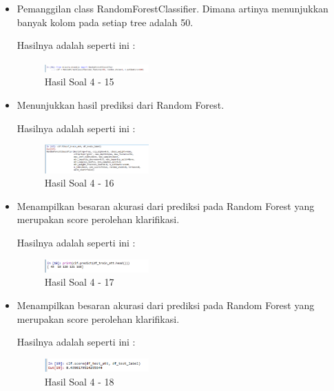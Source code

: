 \begin{enumerate}
\begin{itemize}
	\item Pemanggilan class RandomForestClassifier. Dimana artinya menunjukkan banyak kolom pada setiap tree adalah 50.
	
	Hasilnya adalah seperti ini :

	\begin{figure}[H]
	\centering
		\includegraphics[width=4cm]{figures/1174021/tugas3/materi/soal415.PNG}
		\caption{Hasil Soal 4 - 15}
	\end{figure}

	\item Menunjukkan hasil prediksi dari Random Forest.
	
	Hasilnya adalah seperti ini :

	\begin{figure}[H]
	\centering
		\includegraphics[width=4cm]{figures/1174021/tugas3/materi/soal416.PNG}
		\caption{Hasil Soal 4 - 16}
	\end{figure}

	\item Menampilkan besaran akurasi dari prediksi pada Random Forest yang merupakan score perolehan klarifikasi.
	
	Hasilnya adalah seperti ini :

	\begin{figure}[H]
	\centering
		\includegraphics[width=4cm]{figures/1174021/tugas3/materi/soal417.PNG}
		\caption{Hasil Soal 4 - 17}
	\end{figure}

	\item Menampilkan besaran akurasi dari prediksi pada Random Forest yang merupakan score perolehan klarifikasi.
	
	Hasilnya adalah seperti ini :

	\begin{figure}[H]
	\centering
		\includegraphics[width=4cm]{figures/1174021/tugas3/materi/soal418.PNG}
		\caption{Hasil Soal 4 - 18}
	\end{figure}
\end{itemize}


\end{enumerate}
